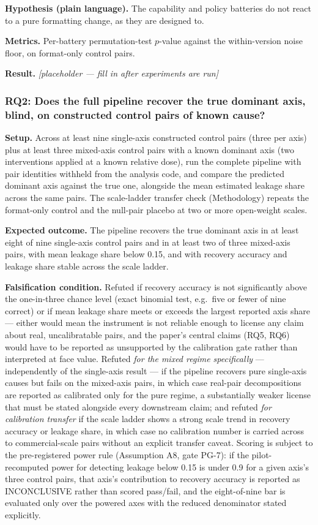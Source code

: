 \documentclass[11pt]{article}
\newcommand{\ph}{\textit{[placeholder --- fill in after experiments are run]}}
\begin{document}
\textbf{Hypothesis (plain language).} The capability and policy batteries do not react to a pure formatting change, as they are designed to.

\textbf{Metrics.} Per-battery permutation-test $p$-value against the within-version noise floor, on format-only control pairs.

\textbf{Result.} \ph

\subsubsection{RQ2: Does the full pipeline recover the true dominant axis, blind, on constructed control pairs of known cause?}
\textbf{Setup.} Across at least nine single-axis constructed control pairs (three per axis) plus at least three mixed-axis control pairs with a known dominant axis (two interventions applied at a known relative dose), run the complete pipeline with pair identities withheld from the analysis code, and compare the predicted dominant axis against the true one, alongside the mean estimated leakage share across the same pairs. The scale-ladder transfer check (Methodology) repeats the format-only control and the null-pair placebo at two or more open-weight scales.

\textbf{Expected outcome.} The pipeline recovers the true dominant axis in at least eight of nine single-axis control pairs and in at least two of three mixed-axis pairs, with mean leakage share below 0.15, and with recovery accuracy and leakage share stable across the scale ladder.

\textbf{Falsification condition.} Refuted if recovery accuracy is not significantly above the one-in-three chance level (exact binomial test, e.g.\ five or fewer of nine correct) or if mean leakage share meets or exceeds the largest reported axis share --- either would mean the instrument is not reliable enough to license any claim about real, uncalibratable pairs, and the paper's central claims (RQ5, RQ6) would have to be reported as unsupported by the calibration gate rather than interpreted at face value. Refuted \emph{for the mixed regime specifically} --- independently of the single-axis result --- if the pipeline recovers pure single-axis causes but fails on the mixed-axis pairs, in which case real-pair decompositions are reported as calibrated only for the pure regime, a substantially weaker license that must be stated alongside every downstream claim; and refuted \emph{for calibration transfer} if the scale ladder shows a strong scale trend in recovery accuracy or leakage share, in which case no calibration number is carried across to commercial-scale pairs without an explicit transfer caveat. Scoring is subject to the pre-registered power rule (Assumption A8, gate PG-7): if the pilot-recomputed power for detecting leakage below 0.15 is under 0.9 for a given axis's three control pairs, that axis's contribution to recovery accuracy is reported as INCONCLUSIVE rather than scored pass/fail, and the eight-of-nine bar is evaluated only over the powered axes with the reduced denominator stated explicitly.
\end{document}
